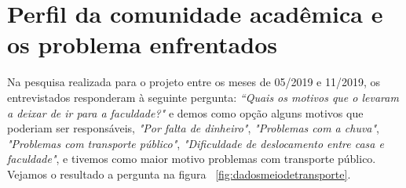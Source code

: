 \section{Perfil da comunidade acadêmica e os problema enfrentados}

Na pesquisa realizada para o projeto entre os meses de 05/2019 e 11/2019, os entrevistados responderam à seguinte pergunta: \textit{“Quais os motivos que o levaram a deixar de ir para a faculdade?"} e demos como opção alguns motivos que poderiam ser responsáveis, \textit{"Por falta de dinheiro"}, \textit{"Problemas com a chuva"}, \textit{"Problemas com transporte público"}, \textit{"Dificuldade de deslocamento entre casa e faculdade"}, e tivemos como maior motivo problemas com transporte público. Vejamos o resultado a pergunta na figura ~\ref{fig:dadosmeiodetransporte}.

